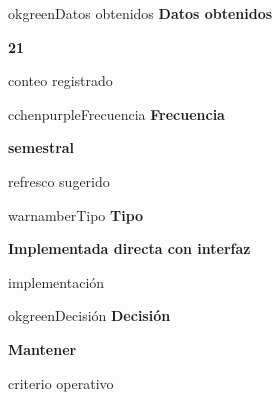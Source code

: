 \documentclass[9pt,a4paper]{extarticle}
\begin{document}
\vspace{0.04cm}
\begin{minipage}{0.24\textwidth}
\begin{metricbox}{okgreen}{Datos obtenidos}
{\large\bfseries Datos obtenidos}\par
{\Large\bfseries 21}\par
{\normalsize conteo registrado}
\end{metricbox}
\end{minipage}\hfill
\begin{minipage}{0.24\textwidth}
\begin{metricbox}{cchenpurple}{Frecuencia}
{\large\bfseries Frecuencia}\par
{\large\bfseries semestral}\par
{\normalsize refresco sugerido}
\end{metricbox}
\end{minipage}\hfill
\begin{minipage}{0.24\textwidth}
\begin{metricbox}{warnamber}{Tipo}
{\large\bfseries Tipo}\par
{\normalsize\bfseries Implementada directa con interfaz}\par
{\normalsize implementación}
\end{metricbox}
\end{minipage}\hfill
\begin{minipage}{0.24\textwidth}
\begin{metricbox}{okgreen}{Decisión}
{\large\bfseries Decisión}\par
{\normalsize\bfseries Mantener}\par
{\normalsize criterio operativo}
\end{metricbox}
\end{minipage}
\end{document}
